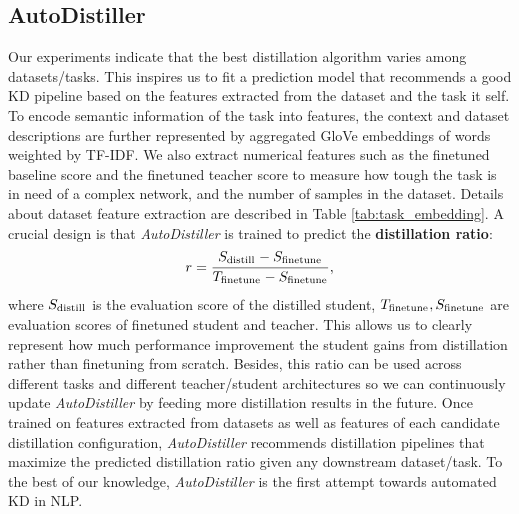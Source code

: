 \documentclass[11pt]{article}
\begin{document}
\subsection{AutoDistiller}
Our experiments indicate that the best distillation algorithm varies among datasets/tasks. This inspires us to fit a prediction model that recommends a good KD pipeline based on the features extracted from the dataset and the task it self. To encode semantic information of the task into features, the context and dataset descriptions are further represented by aggregated GloVe \citep{pennington2014glove} embeddings of words weighted by TF-IDF. We also extract numerical features such as the finetuned baseline score and the finetuned teacher score to measure how tough the task is in need of a complex network, and the number of samples in the dataset. Details about dataset feature extraction are described in Table \ref{tab:task_embedding}. A crucial design is that \emph{AutoDistiller} is trained to predict the \textbf{distillation ratio}:
\begin{equation}
    r=\frac{S_\textsuperscript{distill}-S_\textsuperscript{finetune}}{T_\textsuperscript{finetune}-S_\textsuperscript{finetune}},
\end{equation}
where $S_\textsuperscript{distill}$ is the evaluation score of the distilled student, $T_\textsuperscript{finetune}, S_\textsuperscript{finetune}$ are evaluation scores of finetuned student and teacher. This allows us to clearly represent how much performance improvement the student gains from distillation rather than finetuning from scratch. Besides, this ratio can be used across different tasks and different teacher/student architectures so we can continuously update \emph{AutoDistiller} by feeding more distillation results in the future. Once trained on features extracted from datasets as well as features of each candidate distillation configuration, \emph{AutoDistiller} recommends distillation pipelines that maximize the predicted distillation ratio given any downstream dataset/task. To the best of our knowledge, \emph{AutoDistiller} is the first attempt towards automated KD in NLP.
\label{sec:autodistiller}
\end{document}
